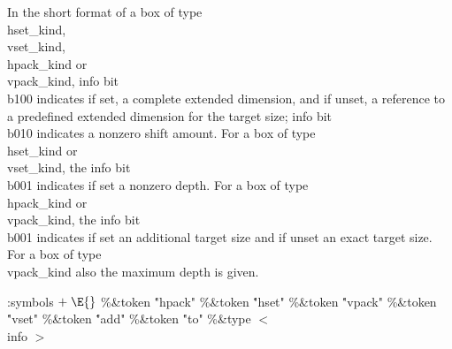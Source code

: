 In the short format of a box of type \\{hset\_kind}, \\{vset\_kind}, \\{hpack\_kind} or \\{vpack\_kind},
info bit \\{b100} indicates if set, a complete extended dimension, and if unset,
a reference to a predefined extended dimension for the target size;
info bit \\{b010} indicates a nonzero shift amount.
For a box of type \\{hset\_kind} or \\{vset\_kind},   the info bit \\{b001} indicates if set a nonzero depth.
For a box of type \\{hpack\_kind} or \\{vpack\_kind}, the info bit \\{b001} indicates if set an additional
target size and if unset an exact target size.
For a box of type \\{vpack\_kind} also the maximum depth is given.

\readcode
\Y\par
\par
\par
\par
\par
\par
\par
\par
\par
\par
\par
\par
\par
\Y\B\4:symbols\X${}\mathrel+\E{}$\6
\8\%\&{token} \5\.{"hpack"}\6
\8\%\&{token} \5\.{"hset"}\6
\8\%\&{token} \5\.{"vpack"}\6
\8\%\&{token} \5\.{"vset"}\6
\8\%\&{token} \5\.{"add"}\6
\8\%\&{token} \5\.{"to"}\6
\8\%\&{type} $<$ \\{info} $>$ \5
\5
\5
\Y
\fi

